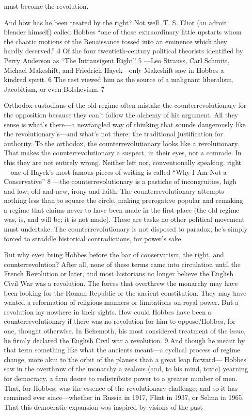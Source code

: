 must become the revolution.{\par} And how has he been treated by the right? Not well. T. S. Eliot (an adroit blender himself) called Hobbes “one of those extraordinary little upstarts whom the chaotic motions of the Renaissance tossed into an eminence which they hardly deserved.” {\color{blue} 4 } Of the four twentieth-century political theorists identified by Perry Anderson as “The Intransigent Right” {\color{blue} 5 } —Leo Strauss, Carl Schmitt, Michael Makeshift, and Friedrich Hayek—only Makeshift saw in Hobbes a kindred spirit. {\color{blue} 6 } The rest viewed him as the source of a malignant liberalism, Jacobitism, or even Bolshevism. {\color{blue} 7 } {\par} Orthodox custodians of the old regime often mistake the counterrevolutionary for the opposition because they can’t follow the alchemy of his argument. All they sense is what’s there—a newfangled way of thinking that sounds dangerously like the revolutionary’s—and what’s not there: the traditional justification for authority. To the orthodox, the counterrevolutionary looks like a revolutionary. That makes the counterrevolutionary a suspect, in their eyes, not a comrade. In this they are not entirely wrong. Neither left nor, conventionally speaking, right—one of Hayek’s most famous pieces of writing is called “Why I Am Not a Conservative” {\color{blue} 8 } —the counterrevolutionary is a pastiche of incongruities, high and low, old and new, irony and faith. The counterrevolutionary attempts nothing less than to square the circle, making prerogative popular and remaking a regime that claims never to have been made in the first place (the old regime was, is, and will be; it is not made). These are tasks no other political movement must undertake. The counterrevolutionary is not disposed to paradox; he’s simply forced to straddle historical contradictions, for power’s sake.{\par} But why even bring Hobbes before the bar of conservatism, the right, and counterrevolution? After all, none of these terms came into circulation until the French Revolution or later, and most historians no longer believe the English Civil War was a revolution. The forces that overthrew the monarchy may have been looking for the Roman Republic or the ancient constitution. They may have wanted a reformation of religious manners or limitations on royal power. But a revolution lay nowhere in their sights. How could Hobbes have been a counterrevolutionary if there was no revolution for him to oppose?Hobbes, for one, thought otherwise. In Behemoth, his most considered treatment of the issue, he firmly declared the English Civil war a revolution. {\color{blue} 9 } And though he meant by that term something like what the ancients meant—a cyclical process of regime change, more akin to the orbit of the planets than a great leap forward— Hobbes saw in the overthrow of the monarchy a zealous (and, to his mind, toxic) yearning for democracy, a firm desire to redistribute power to a greater number of men. That, for Hobbes, was the essence of the revolutionary challenge; and so it has remained ever since—whether in Russia in 1917, Flint in 1937, or Selma in 1965. That this democratic expansion was inspired by visions of the past 